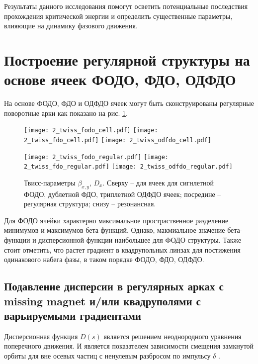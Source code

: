 \par Результаты данного исследования помогут осветить потенциальные последствия прохождения критической энергии и определить существенные параметры, влияющие на динамику фазового движения.

	\section{Построение регулярной структуры на основе ячеек ФОДО, ФДО, ОДФДО}\label{sec:transition_jump/FODO_FDO}

\par На основе ФОДО, ФДО и ОДФДО ячеек могут быть сконструированы регулярные поворотные арки как показано на рис. \ref{fig:fodo_fdo_odfdo_regular}.

\begin{figure} [h!]

   \texttt{[image: 2\_twiss\_fodo\_cell.pdf]}
   \texttt{[image: 2\_twiss\_fdo\_cell.pdf]}
   \texttt{[image: 2\_twiss\_odfdo\_cell.pdf]}

   \texttt{[image: 2\_twiss\_fodo\_regular.pdf]}
   \texttt{[image: 2\_twiss\_fdo\_regular.pdf]}
   \texttt{[image: 2\_twiss\_odfdo\_regular.pdf]}

   \caption{Твисс-параметры $\beta_{x,y}$, $D_{x}$. Сверху -- для ячеек для сигнлетной ФОДО, дублетной ФДО, триплетной ОДФДО ячеек; посредине -- регулярная структура; снизу -- резонансная.}
   \label{fig:fodo_fdo_odfdo_regular}
\end{figure}

\par Для ФОДО ячейки характерно максимальное простраственное разделение минимумов и максимумов бета-функций. Однако, макмиальное значение бета-функции и дисперсионной функции наибольшее для ФОДО структуры. Также стоит отметить, что растет градиент в квадрупольных линзах для постижения одинакового набега фазы, в таком порядке ФОДО, ФДО, ОДФДО. 

	\subsection{Подавление дисперсии в регулярных арках с missing magnet и/или квадруполями с варьируемыми градиентами}\label{sec:transition_jump/suppression}

\par Дисперсионная функция $D(s)$ является решением неоднородного уравнения поперечного движения.
И является показателем зависимости смещения замкнутой орбиты для вне осевых частиц с ненулевым разбросом по импульсу $\delta$ \cite{lee}.

